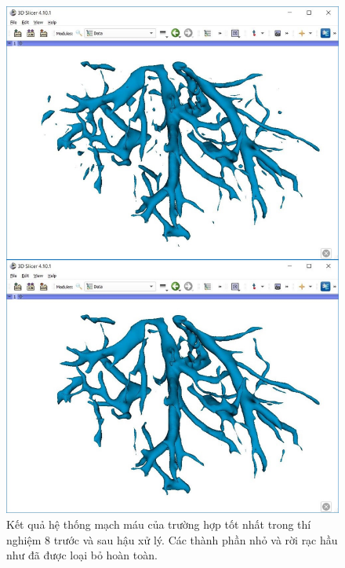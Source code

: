 	\begin{figure}[h!]
		\includegraphics[width=\textwidth, height=0.925\textheight]{figures/result_e8_best_prediction_post_processing}
		\caption[Kết quả hệ thống mạch máu của trường hợp tốt nhất trong thí nghiệm 8.]{Kết quả hệ thống mạch máu của trường hợp tốt nhất trong thí nghiệm 8 trước và sau hậu xử lý. Các thành phần nhỏ và rời rạc hầu như đã được loại bỏ hoàn toàn.}
		\label{fig:result_e8_best_prediction_post_processing}
	\end{figure}
